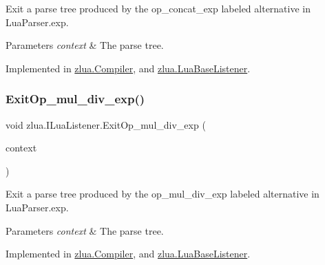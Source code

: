 Exit a parse tree produced by the {\ttfamily op\+\_\+concat\+\_\+exp} labeled alternative in Lua\+Parser.\+exp. 


\begin{DoxyParams}{Parameters}
{\em context} & The parse tree.\\
\hline
\end{DoxyParams}


Implemented in \mbox{\hyperlink{classzlua_1_1_compiler_ac935829de2864ba1352061c546d1c74a}{zlua.\+Compiler}}, and \mbox{\hyperlink{classzlua_1_1_lua_base_listener_a5daf4d3857a7580b51667c00c5395db1}{zlua.\+Lua\+Base\+Listener}}.

\mbox{\label{interfacezlua_1_1_i_lua_listener_a25a0b962824e954f08d1dc84e4e4d13d}} 
\subsubsection{\texorpdfstring{Exit\+Op\+\_\+mul\+\_\+div\+\_\+exp()}{ExitOp\_mul\_div\_exp()}}
{\footnotesize\ttfamily void zlua.\+I\+Lua\+Listener.\+Exit\+Op\+\_\+mul\+\_\+div\+\_\+exp (\begin{DoxyParamCaption}\item[{\mbox{[}\+Not\+Null\mbox{]} \mbox{\hyperlink{classzlua_1_1_lua_parser_1_1_op__mul__div__exp_context}{Lua\+Parser.\+Op\+\_\+mul\+\_\+div\+\_\+exp\+Context}}}]{context }\end{DoxyParamCaption})}



Exit a parse tree produced by the {\ttfamily op\+\_\+mul\+\_\+div\+\_\+exp} labeled alternative in Lua\+Parser.\+exp. 


\begin{DoxyParams}{Parameters}
{\em context} & The parse tree.\\
\hline
\end{DoxyParams}


Implemented in \mbox{\hyperlink{classzlua_1_1_compiler_a970ec54bed0c80f053b68a8dcff3a245}{zlua.\+Compiler}}, and \mbox{\hyperlink{classzlua_1_1_lua_base_listener_ab89797d488c6f1700d00a8a609baf9f5}{zlua.\+Lua\+Base\+Listener}}.

\mbox{\label{interfacezlua_1_1_i_lua_listener_acd1c99a866862f8c938fd314f3859852}} 
